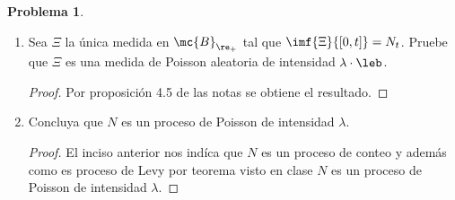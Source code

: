 \documentclass[a5paper,oneside]{amsart}
\theoremstyle{plain}
\theoremstyle{definition}
\newtheorem{problema}{Problema}
\begin{document}
\begin{problema}
\begin{enumerate}
\begin{proof}
Por lo tanto $N_{t+s}\geq N_t$ casi seguramente.
\end{proof}

\item Sea $\Xi$ la \'unica medida en $\mc{B}_{\re_+}$ tal que $\imf{\Xi}{[0,t]}=N_t$. Pruebe que $\Xi$ es una medida de Poisson aleatoria de intensidad $\lambda \cdot\leb$.
\begin{proof}
Por proposici\'on 4.5  de las notas se obtiene el resultado.
\end{proof}

\item Concluya que $N$ es un proceso de Poisson de intensidad $\lambda$.

\begin{proof}
El inciso anterior nos ind\'ica que $N$ es un proceso de conteo y adem\'as como es proceso de Levy por teorema visto en clase $N$ es un proceso de Poisson de intensidad $\lambda$.
\end{proof}

\end{enumerate}
\end{problema}
\end{document}
